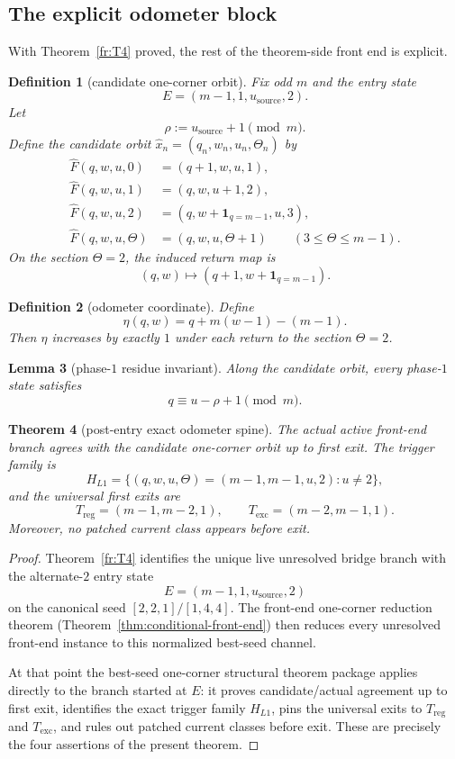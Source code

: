 \documentclass[11pt]{article}
\newtheorem{theorem}{Theorem}[section]
\newtheorem{lemma}[theorem]{Lemma}
\newtheorem{definition}[theorem]{Definition}
\newcommand{\CanL}{[2,2,1]}
\newcommand{\CanR}{[1,4,4]}
\newcommand{\CanSeed}{\CanL/\CanR}
\begin{document}
\subsection{The explicit odometer block}

With Theorem~\ref{fr:T4} proved, the rest of the theorem-side front end is explicit.

\begin{definition}[candidate one-corner orbit]
Fix odd \(m\) and the entry state
\[
E=(m-1,1,u_{\mathrm{source}},2).
\]
Let
\[
\rho:=u_{\mathrm{source}}+1 \pmod m.
\]
Define the candidate orbit \(\widehat x_n=(q_n,w_n,u_n,\Theta_n)\) by
\begin{align*}
\widehat F(q,w,u,0) &= (q+1,w,u,1),\\
\widehat F(q,w,u,1) &= (q,w,u+1,2),\\
\widehat F(q,w,u,2) &= (q,w+\mathbf 1_{q=m-1},u,3),\\
\widehat F(q,w,u,\Theta) &= (q,w,u,\Theta+1)\qquad(3\le \Theta\le m-1).
\end{align*}
On the section \(\Theta=2\), the induced return map is
\[
(q,w)\mapsto(q+1,w+\mathbf 1_{q=m-1}).
\]
\end{definition}

\begin{definition}[odometer coordinate]
Define
\[
\eta(q,w)=q+m(w-1)-(m-1).
\]
Then \(\eta\) increases by exactly \(1\) under each return to the section
\(\Theta=2\).
\end{definition}

\begin{lemma}[phase-$1$ residue invariant]
Along the candidate orbit, every phase-$1$ state satisfies
\[
q\equiv u-\rho+1 \pmod m.
\]
\end{lemma}

\begin{theorem}[post-entry exact odometer spine]
\label{thm:odometer-spine}
The actual active front-end branch agrees with the candidate one-corner
orbit up to first exit.
The trigger family is
\[
H_{L1}=\{(q,w,u,\Theta)=(m-1,m-1,u,2):u\neq 2\},
\]
and the universal first exits are
\[
T_{\mathrm{reg}}=(m-1,m-2,1),
\qquad
T_{\mathrm{exc}}=(m-2,m-1,1).
\]
Moreover, no patched current class appears before exit.
\end{theorem}

\begin{proof}
Theorem~\ref{fr:T4} identifies the unique live unresolved bridge branch with the
alternate-$2$ entry state
\[
E=(m-1,1,u_{\mathrm{source}},2)
\]
on the canonical seed \(\CanSeed\).
The front-end one-corner reduction theorem
(Theorem~\ref{thm:conditional-front-end}) then reduces every unresolved
front-end instance to this normalized best-seed channel.

At that point the best-seed one-corner structural theorem package applies
directly to the branch started at \(E\): it proves candidate/actual agreement up
to first exit, identifies the exact trigger family \(H_{L1}\), pins the
universal exits to \(T_{\mathrm{reg}}\) and \(T_{\mathrm{exc}}\), and rules out
patched current classes before exit.
These are precisely the four assertions of the present theorem.
\end{proof}
\end{document}
